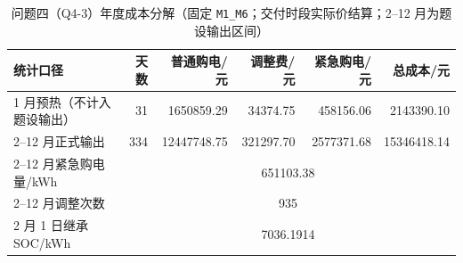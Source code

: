 \begin{table}[htbp]
\centering
\caption{问题四（Q4-3）年度成本分解（固定 \texttt{M1\_M6}；交付时段实际价结算；2--12 月为题设输出区间）}\label{tab:q4-3-cost-summary}
\normalsize\setlength{\tabcolsep}{5pt}
\begin{tabular}{@{}lrrrrr@{}}
\toprule
统计口径 & 天数 & 普通购电/元 & 调整费/元 & 紧急购电/元 & 总成本/元 \\
\midrule
1 月预热（不计入题设输出） & 31 & 1650859.29 & 34374.75 & 458156.06 & 2143390.10 \\
2--12 月正式输出 & 334 & 12447748.75 & 321297.70 & 2577371.68 & 15346418.14 \\
\midrule
2--12 月紧急购电量/kWh & \multicolumn{5}{c}{651103.38} \\
2--12 月调整次数 & \multicolumn{5}{c}{935} \\
2 月 1 日继承 SOC/kWh & \multicolumn{5}{c}{7036.1914} \\
\bottomrule
\end{tabular}
\end{table}
